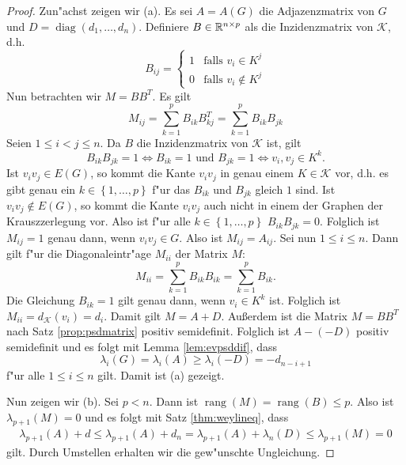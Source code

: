 \begin{proof}
  Zun"achst zeigen wir (a). Es sei $A=A(G)$ die Adjazenzmatrix von $G$ und $D = \operatorname{diag}(d_1,\dots,d_n)$. Definiere $B\in{\mathbb{R}}^{n\times p}$ als die Inzidenzmatrix von $\mathcal K$, d.h. $$B_{ij} = \begin{cases}
    1 & \text{falls } v_i \in K^j \\ 0 & \text{falls }v_i \notin K^j
  \end{cases}$$ 
  Nun betrachten wir $M=BB^{T}$. Es gilt
  \[
    M_{ij} = \sum\limits_{k=1}^{p}B_{ik}B^{T}_{kj} = \sum\limits_{k=1}^{p}B_{ik}B_{jk}
  \]
  Seien $1\leq i < j \leq n$. Da $B$ die Inzidenzmatrix von $\mathcal{K}$ ist, gilt  $$ B_{ik} B_{jk} = 1 \Leftrightarrow B_{ik} = 1 \text{ und } B_{jk} = 1 \Leftrightarrow v_i,v_j \in K^{k}.$$ Ist $v_iv_j \in E(G)$, so kommt die Kante $v_iv_j$ in genau einem $K\in \mathcal{K}$ vor, d.h. es gibt genau ein $k\in \left\{ 1,\dots,p \right\}$ f"ur das $B_{ik}$ und $B_{jk}$ gleich $1$ sind. Ist $v_iv_j\notin E(G)$, so kommt die Kante $v_iv_j$ auch nicht in einem der Graphen der Krauszzerlegung vor.
  Also ist f"ur alle $k\in \left\{ 1,\dots, p \right\}$ $B_{ik}B_{jk} = 0$. Folglich ist $M_{ij}=1$ genau dann, wenn $v_iv_j\in G$. Also ist $M_{ij} = A_{ij}$.
  Sei nun $1\leq i \leq n$. Dann gilt f"ur die Diagonaleintr"age $M_{ii}$ der Matrix $M$:
  \[
    M_{ii} = \sum\limits_{k=1}^{p}B_{ik}B_{ik} = \sum\limits_{k=1}^{p} B_{ik}.
  \]
  Die Gleichung $B_{ik}=1$ gilt genau dann, wenn $v_i \in K^k$ ist. Folglich ist $M_{ii}= d_{\mathcal{K}}(v_i)= d_i$. Damit gilt $M=A+D$. Au{\ss}erdem ist die Matrix $M=BB^{T}$ nach Satz \ref{prop:psdmatrix} positiv semidefinit.
  Folglich ist $A- (-D)$ positiv semidefinit und es folgt mit Lemma \ref{lem:evpsddif}, dass 
  \begin{equation*}
    \lambda_i(G) = \lambda_i(A) \geq \lambda_i(-D) = -d_{n-i+1}
  \end{equation*}
f"ur alle $1 \leq i \leq n$ gilt. 
  Damit ist (a) gezeigt.

  Nun zeigen wir (b). Sei $p<n$. Dann ist $\operatorname{rang}(M)= \operatorname{rang}(B) \leq p$. Also ist $\lambda_{p+1}(M) = 0$ und es folgt mit Satz \ref{thm:weylineq}, dass 
  \begin{align*}
    \lambda_{p+1}(A) + d \leq \lambda_{p+1}(A) + d_{n} = \lambda_{p+1}(A) + \lambda_{n} (D) \leq \lambda_{p+1} (M) = 0
  \end{align*}
  gilt.
  Durch Umstellen erhalten wir die gew"unschte Ungleichung.
\end{proof}

